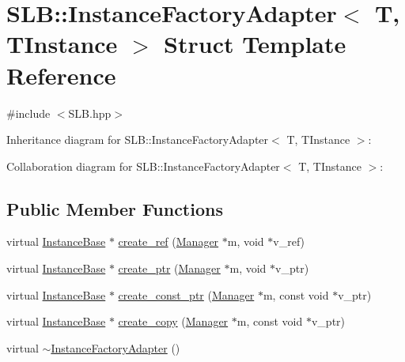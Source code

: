 \hypertarget{structSLB_1_1InstanceFactoryAdapter}{}\section{S\+LB\+:\+:Instance\+Factory\+Adapter$<$ T, T\+Instance $>$ Struct Template Reference}
\label{structSLB_1_1InstanceFactoryAdapter}


{\ttfamily \#include $<$S\+L\+B.\+hpp$>$}



Inheritance diagram for S\+LB\+:\+:Instance\+Factory\+Adapter$<$ T, T\+Instance $>$\+:


Collaboration diagram for S\+LB\+:\+:Instance\+Factory\+Adapter$<$ T, T\+Instance $>$\+:
\subsection*{Public Member Functions}
\begin{DoxyCompactItemize}
\item 
virtual \hyperlink{classSLB_1_1InstanceBase}{Instance\+Base} $\ast$ \hyperlink{structSLB_1_1InstanceFactoryAdapter_a176b77923c0bdc1ed3bc26b085b9446d}{create\+\_\+ref} (\hyperlink{classSLB_1_1Manager}{Manager} $\ast$m, void $\ast$v\+\_\+ref)
\item 
virtual \hyperlink{classSLB_1_1InstanceBase}{Instance\+Base} $\ast$ \hyperlink{structSLB_1_1InstanceFactoryAdapter_afaede2914bac91dc46be444fa0532c10}{create\+\_\+ptr} (\hyperlink{classSLB_1_1Manager}{Manager} $\ast$m, void $\ast$v\+\_\+ptr)
\item 
virtual \hyperlink{classSLB_1_1InstanceBase}{Instance\+Base} $\ast$ \hyperlink{structSLB_1_1InstanceFactoryAdapter_a1a8b23ab0d6f5a11c76b34c2ee3358f5}{create\+\_\+const\+\_\+ptr} (\hyperlink{classSLB_1_1Manager}{Manager} $\ast$m, const void $\ast$v\+\_\+ptr)
\item 
virtual \hyperlink{classSLB_1_1InstanceBase}{Instance\+Base} $\ast$ \hyperlink{structSLB_1_1InstanceFactoryAdapter_a388ae8c9f9a3ee8834391c113b375755}{create\+\_\+copy} (\hyperlink{classSLB_1_1Manager}{Manager} $\ast$m, const void $\ast$v\+\_\+ptr)
\item 
virtual \hyperlink{structSLB_1_1InstanceFactoryAdapter_ab8baeb3c5a9a759180499c6b6b1b7f40}{$\sim$\+Instance\+Factory\+Adapter} ()
\end{DoxyCompactItemize}


